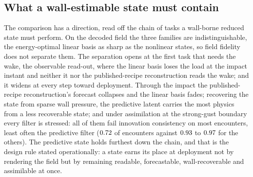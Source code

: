 
\subsection{What a wall-estimable state must contain}
\label{sec:disc_mechanism}
\label{sec:disc_caveat}

The comparison has a direction, read off the chain of tasks a wall-borne reduced state must perform. On the decoded field the three families are indistinguishable, the energy-optimal linear basis as sharp as the nonlinear states, so field fidelity does not separate them. The separation opens at the first task that needs the wake, the observable read-out, where the linear basis loses the load at the impact instant and neither it nor the published-recipe reconstruction reads the wake; and it widens at every step toward deployment. Through the impact the published-recipe reconstruction's forecast collapses and the linear basis fades; recovering the state from sparse wall pressure, the predictive latent carries the most physics from a less recoverable state; and under assimilation at the strong-gust boundary every filter is stressed: all of them fail innovation consistency on most encounters, least often the predictive filter ($0.72$ of encounters against $0.93$ to $0.97$ for the others). The predictive state holds furthest down the chain, and that is the design rule stated operationally: a state earns its place at deployment not by rendering the field but by remaining readable, forecastable, wall-recoverable and assimilable at once.\re

